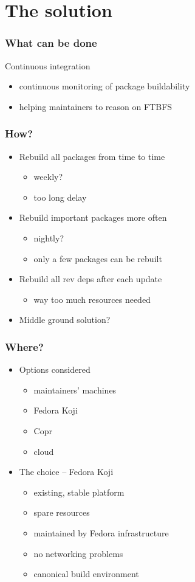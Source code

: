\documentclass[pdftex,unicode,xcolor=table]{beamer}
\begin{document}
\section{The solution}
\Large
\begin{frame}
  \frametitle{What can be done}
  Continuous integration
  \begin{itemize}
    \item continuous monitoring of package buildability
    \item helping maintainers to reason on FTBFS
  \end{itemize}
\end{frame}

\begin{frame}
  \frametitle{How?}
  \begin{itemize}
  \item Rebuild all packages from time to time
    \begin{itemize}
      \item weekly?
      \item too long delay
    \end{itemize}
  \item Rebuild important packages more often
    \begin{itemize}
      \item nightly?
      \item only a few packages can be rebuilt
    \end{itemize}
  \item Rebuild all rev deps after each update
    \begin{itemize}
      \item way too much resources needed
    \end{itemize}
  \item Middle ground solution?
  \end{itemize}
\end{frame}

\begin{frame}
  \frametitle{Where?}
  \begin{itemize}
  \item Options considered
    \begin{itemize}
      \item maintainers' machines
      \item Fedora Koji
      \item Copr
      \item cloud
    \end{itemize}
  \item The choice -- Fedora Koji
    \begin{itemize}
      \item existing, stable platform
      \item spare resources
      \item maintained by Fedora infrastructure
      \item no networking problems
      \item canonical build environment
    \end{itemize}
  \end{itemize}
\end{frame}
\end{document}
